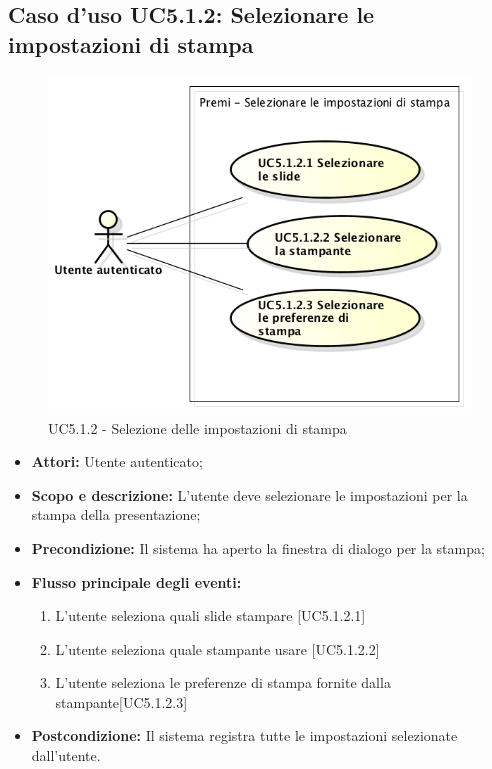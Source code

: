 	\subsection{Caso d'uso UC5.1.2: Selezionare le impostazioni di stampa}
	\begin{figure}[h] 
		\centering 
		\includegraphics[scale=0.45] {img/UC5.1.2.png} 
		\caption{UC5.1.2 - Selezione delle impostazioni di stampa} 
	\end{figure}
	
	\begin{itemize}
		\item \textbf{Attori:} Utente autenticato;
		\item \textbf{Scopo e descrizione:} L'utente deve selezionare le impostazioni per la stampa della presentazione;
		\item \textbf{Precondizione:} Il sistema ha aperto la finestra di dialogo per la stampa;
		\item \textbf{Flusso principale degli eventi:}
		\begin{enumerate}
			\item L'utente seleziona quali slide stampare [UC5.1.2.1]
			\item L'utente seleziona quale stampante usare [UC5.1.2.2]
			\item L'utente seleziona le preferenze di stampa fornite dalla stampante[UC5.1.2.3]
		\end{enumerate}
		\item \textbf{Postcondizione:} Il sistema registra tutte le impostazioni selezionate dall'utente.
	\end{itemize}
	
